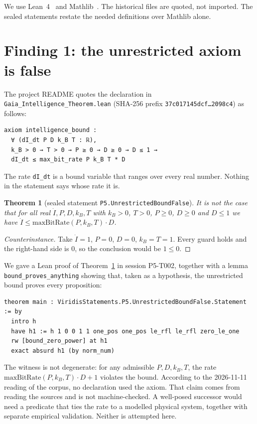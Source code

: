 \documentclass[11pt]{article}
\newtheorem{theorem}{Theorem}
\theoremstyle{remark}
\begin{document}
We use Lean~4~\citep{lean4} and Mathlib~\citep{mathlib2020}. The historical files are quoted, not
imported. The sealed statements restate the needed definitions over Mathlib alone.

\section{Finding 1: the unrestricted axiom is false}\label{sec:axiom}
The project README quotes the declaration in \texttt{Gaia\_Intelligence\_Theorem.lean}
(SHA-256 prefix \texttt{37c017145dcf\ldots2098c4}) as follows:
\begin{lstlisting}
axiom intelligence_bound :
  ∀ (dI_dt P D k_B T : ℝ),
  k_B > 0 → T > 0 → P ≥ 0 → D ≥ 0 → D ≤ 1 →
  dI_dt ≤ max_bit_rate P k_B T * D
\end{lstlisting}
The rate \texttt{dI\_dt} is a bound variable that ranges over every real number. Nothing in the
statement says whose rate it is.

\begin{theorem}[sealed statement \texttt{P5.UnrestrictedBoundFalse}]\label{thm:false}
It is not the case that for all real $\dot I,P,D,k_B,T$ with $k_B>0$, $T>0$, $P\ge0$, $D\ge0$
and $D\le1$ we have $\dot I\le\mathrm{maxBitRate}(P,k_B,T)\cdot D$.
\end{theorem}
\begin{proof}[Counterinstance]
Take $\dot I=1$, $P=0$, $D=0$, $k_B=T=1$. Every guard holds and the right-hand side is $0$, so
the conclusion would be $1\le0$.
\end{proof}
We gave a Lean proof of Theorem~\ref{thm:false} in session P5-T002, together with a lemma
\texttt{bound\_proves\_anything} showing that, taken as a hypothesis, the unrestricted bound
proves every proposition:
\begin{lstlisting}
theorem main : ViridisStatements.P5.UnrestrictedBoundFalse.Statement := by
  intro h
  have h1 := h 1 0 0 1 1 one_pos one_pos le_rfl le_rfl zero_le_one
  rw [bound_zero_power] at h1
  exact absurd h1 (by norm_num)
\end{lstlisting}
The witness is not degenerate: for any admissible $P,D,k_B,T$, the rate
$\mathrm{maxBitRate}(P,k_B,T)\cdot D+1$ violates the bound. According to the 2026-11-11 reading of
the corpus, no declaration used the axiom. That claim comes from reading the sources and is not
machine-checked. A well-posed successor would need a predicate that ties the rate to a modelled
physical system, together with separate empirical validation. Neither is attempted here.
\end{document}
